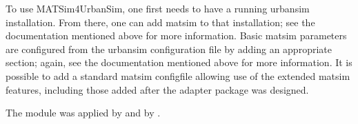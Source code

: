 To use MATSim4UrbanSim, one first needs to have a running \gls{urbansim} installation. 
From there, one can add \gls{matsim} to that installation; see %
the documentation mentioned above for more information. 
Basic \gls{matsim} parameters are configured from the \gls{urbansim} configuration file by adding an appropriate section; again, see 
the documentation mentioned above for more information. 
It is possible to add a standard \gls{matsim} \gls{configfile} allowing use of the extended \gls{matsim} features, including those added after the adapter package was designed.

The module was applied by \citet{CabritaEtcSustaincityHandbookBrusselsChapter} and by \citet[][]{ZoelligRenner_PhDThesis_2014}.

